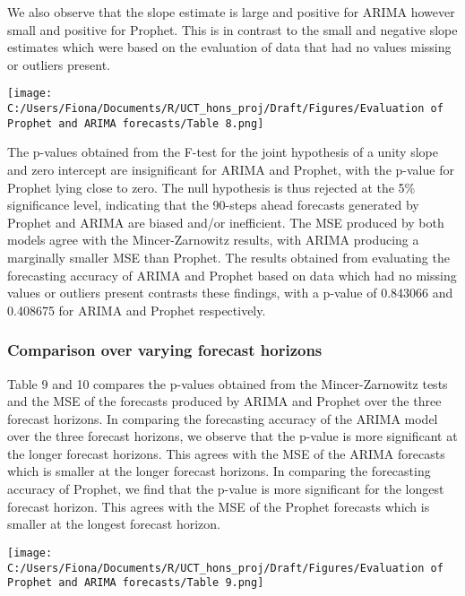 \documentclass[12pt,a4paper]{article}
\numberwithin{equation}{section}
\numberwithin{figure}{section}
\numberwithin{table}{section}
\let\origfigure\figure
\let\endorigfigure\endfigure
\renewenvironment{figure}[1][2] {
    \expandafter\origfigure\expandafter[H]
} {
    \endorigfigure
}
\begin{document}
We also observe that the slope estimate is large and positive for ARIMA
however small and positive for Prophet. This is in contrast to the small
and negative slope estimates which were based on the evaluation of data
that had no values missing or outliers present.

\begin{figure}[htbp]
\centering
\texttt{[image: C:/Users/Fiona/Documents/R/UCT\_hons\_proj/Draft/Figures/Evaluation of Prophet and ARIMA forecasts/Table 8.png]}
\caption{Mincer-Zarnowitz results for 90-step ahead forecasts}
\end{figure}

The p-values obtained from the F-test for the joint hypothesis of a
unity slope and zero intercept are insignificant for ARIMA and Prophet,
with the p-value for Prophet lying close to zero. The null hypothesis is
thus rejected at the 5\% significance level, indicating that the
90-steps ahead forecasts generated by Prophet and ARIMA are biased
and/or inefficient. The MSE produced by both models agree with the
Mincer-Zarnowitz results, with ARIMA producing a marginally smaller MSE
than Prophet. The results obtained from evaluating the forecasting
accuracy of ARIMA and Prophet based on data which had no missing values
or outliers present contrasts these findings, with a p-value of 0.843066
and 0.408675 for ARIMA and Prophet respectively.

\subsubsection{Comparison over varying forecast
horizons}\label{comparison-over-varying-forecast-horizons-1}

Table 9 and 10 compares the p-values obtained from the Mincer-Zarnowitz
tests and the MSE of the forecasts produced by ARIMA and Prophet over
the three forecast horizons. In comparing the forecasting accuracy of
the ARIMA model over the three forecast horizons, we observe that the
p-value is more significant at the longer forecast horizons. This agrees
with the MSE of the ARIMA forecasts which is smaller at the longer
forecast horizons. In comparing the forecasting accuracy of Prophet, we
find that the p-value is more significant for the longest forecast
horizon. This agrees with the MSE of the Prophet forecasts which is
smaller at the longest forecast horizon.

\begin{figure}[htbp]
\centering
\texttt{[image: C:/Users/Fiona/Documents/R/UCT\_hons\_proj/Draft/Figures/Evaluation of Prophet and ARIMA forecasts/Table 9.png]}
\caption{Mincer-Zarnowitz results for all forecast horizons}
\end{figure}
\end{document}
